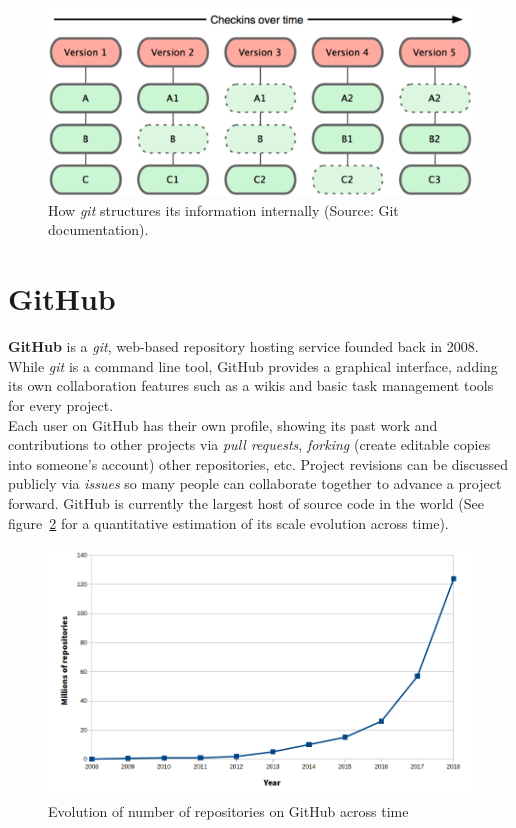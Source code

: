 \documentclass[a4paper, 12pt]{book}
\begin{document}
\begin{figure}
  \centering
  \includegraphics[width=12cm, keepaspectratio]{img/snapshots-git}
  \caption{How \emph{git} structures its information internally (Source: Git documentation).}
  \label{fig:info-git}
\end{figure}
\section{GitHub}
\label{sec:github}
\textbf{GitHub} is a \emph{git}, web-based repository hosting service founded back in 2008. While \emph{git} is a command
line tool, GitHub provides a graphical interface, adding its own collaboration features such as a wikis and basic task
management tools for every project.\\
Each user on GitHub has their own profile, showing its past work and contributions to
other projects via \textit{pull requests}, \textit{forking} (create editable copies into someone's account) other repositories, etc.
Project revisions can be discussed publicly via \textit{issues} so many people can collaborate together to advance a project
forward. GitHub is currently the largest host of source code in the world (See figure~\ref{fig:total-repo-number} for a quantitative
estimation of its scale evolution across time).
\begin{figure}
  \centering
  \includegraphics[width=14cm, keepaspectratio]{img/number-github-repos}
  \caption{Evolution of number of repositories on GitHub across time}
  \label{fig:total-repo-number}
\end{figure}
\end{document}
